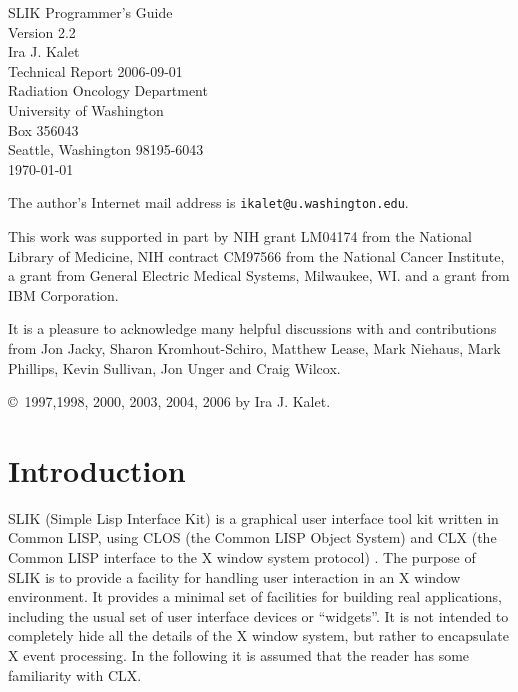\documentclass[twoside,openright,11pt]{report}
\newcommand{\tp}[1]{\texttt{#1}}
\begin{document}
\begin{titlepage}

\vspace*{1.2in}

\begin{minipage}{4.8in}
\begin{center}
{\LARGE SLIK Programmer's Guide\\[2mm]
Version 2.2}\\[5mm]
Ira J. Kalet\\[3mm]
Technical Report 2006-09-01\\
Radiation Oncology Department\\
University of Washington\\
Box 356043\\
Seattle, Washington 98195-6043\\[2mm]
\today
\end{center}
\end{minipage}

\vspace*{5cm}

The author's Internet mail address is \tp{ikalet@u.washington.edu}.

This work was supported in part by NIH grant LM04174 from the National
Library of Medicine, NIH contract CM97566 from the National Cancer
Institute, a grant from General Electric Medical Systems, Milwaukee,
WI. and a grant from IBM Corporation.

It is a pleasure to acknowledge many helpful discussions with and
contributions from Jon Jacky, Sharon Kromhout-Schiro, Matthew Lease,
Mark Niehaus, Mark Phillips, Kevin Sullivan, Jon Unger and Craig
Wilcox.

\end{titlepage}

\vspace*{6in}
\copyright\ 1997,1998, 2000, 2003, 2004, 2006 by Ira J. Kalet.


\tableofcontents

\newpage

\chapter{Introduction}

SLIK (Simple Lisp Interface Kit) is a graphical user interface tool
kit written in Common LISP, using CLOS (the Common LISP Object System)
and CLX (the Common LISP interface to the X window system protocol)
\cite{scheifler89}.  The purpose of SLIK is to provide a facility for
handling user interaction in an X window environment.  It provides a
minimal set of facilities for building real applications, including
the usual set of user interface devices or ``widgets''.  It is not
intended to completely hide all the details of the X window system,
but rather to encapsulate X event processing.  In the following it is
assumed that the reader has some familiarity with CLX.
\end{document}
